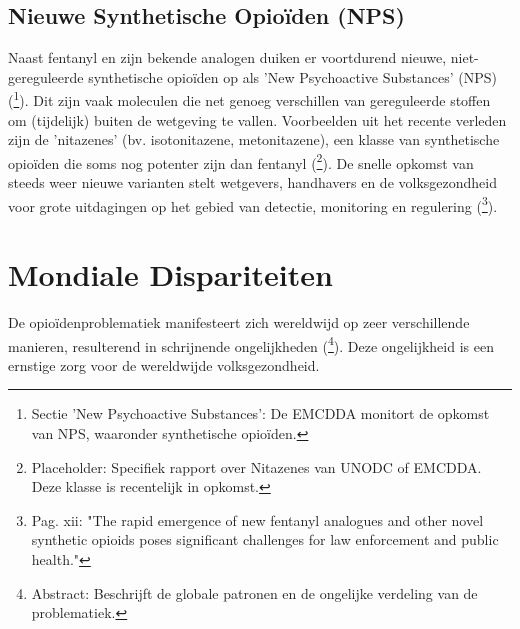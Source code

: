 \documentclass[11pt, a4paper]{report} %
\begin{document}
\subsection{Nieuwe Synthetische Opioïden (NPS)}
Naast fentanyl en zijn bekende analogen duiken er voortdurend nieuwe, niet-gereguleerde synthetische opioïden op als 'New Psychoactive Substances' (NPS) (\cite{EMCDDAFentanylProfile}\footnote{Sectie 'New Psychoactive Substances': De EMCDDA monitort de opkomst van NPS, waaronder synthetische opioïden.}). Dit zijn vaak moleculen die net genoeg verschillen van gereguleerde stoffen om (tijdelijk) buiten de wetgeving te vallen. Voorbeelden uit het recente verleden zijn de 'nitazenes' (bv. isotonitazene, metonitazene), een klasse van synthetische opioïden die soms nog potenter zijn dan fentanyl (\cite{UNODC_NitazeneReport}\footnote{Placeholder: Specifiek rapport over Nitazenes van UNODC of EMCDDA. Deze klasse is recentelijk in opkomst.}). De snelle opkomst van steeds weer nieuwe varianten stelt wetgevers, handhavers en de volksgezondheid voor grote uitdagingen op het gebied van detectie, monitoring en regulering (\cite{Pardo2019FutureFentanyl}\footnote{Pag. xii: "The rapid emergence of new fentanyl analogues and other novel synthetic opioids poses significant challenges for law enforcement and public health."}).

\section{Mondiale Dispariteiten}
De opioïdenproblematiek manifesteert zich wereldwijd op zeer verschillende manieren, resulterend in schrijnende ongelijkheden (\cite{Degenhardt2019GlobalPatterns}\footnote{Abstract: Beschrijft de globale patronen en de ongelijke verdeling van de problematiek.}). Deze ongelijkheid is een ernstige zorg voor de wereldwijde volksgezondheid.
\end{document}
